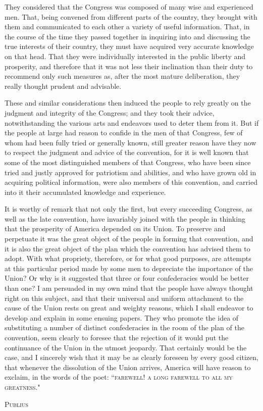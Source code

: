 They considered that the Congress was composed of many wise and experienced men. 
That, being convened from different parts of the country, they brought with them and communicated to each other a variety of useful information. 
That, in the course of the time they passed together in inquiring into and discussing the true interests of their country, they must have acquired very accurate knowledge on that head. 
That they were individually interested in the public liberty and prosperity, and therefore that it was not less their inclination than their duty to recommend only such measures as, after the most mature deliberation, they really thought prudent and advisable.

These and similar considerations then induced the people to rely greatly on the judgment and integrity of the Congress; and they took their advice, notwithstanding the various arts and endeavors used to deter them from it. 
But if the people at large had reason to confide in the men of that Congress, few of whom had been fully tried or generally known, still greater reason have they now to respect the judgment and advice of the convention, for it is well known that some of the most distinguished members of that Congress, who have been since tried and justly approved for patriotism and abilities, and who have grown old in acquiring political information, were also members of this convention, and carried into it their accumulated knowledge and experience.

It is worthy of remark that not only the first, but every succeeding Congress, as well as the late convention, have invariably joined with the people in thinking that the prosperity of America depended on its Union. 
To preserve and perpetuate it was the great object of the people in forming that convention, and it is also the great object of the plan which the convention has advised them to adopt. 
With what propriety, therefore, or for what good purposes, are attempts at this particular period made by some men to depreciate the importance of the Union? 
Or why is it suggested that three or four confederacies would be better than one? 
I am persuaded in my own mind that the people have always thought right on this subject, and that their universal and uniform attachment to the cause of the Union rests on great and weighty reasons, which I shall endeavor to develop and explain in some ensuing papers. 
They who promote the idea of substituting a number of distinct confederacies in the room of the plan of the convention, seem clearly to foresee that the rejection of it would put the continuance of the Union in the utmost jeopardy. 
That certainly would be the case, and I sincerely wish that it may be as clearly foreseen by every good citizen, that whenever the dissolution of the Union arrives, America will have reason to exclaim, in the words of the poet: ``\textsc{farewell}! 
\textsc{a long farewell to all my greatness}."

\vspace{.5cm}
\textsc{Publius}

\vspace{1.5cm}

